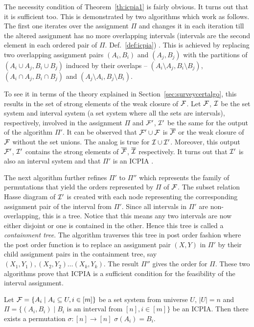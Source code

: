 The necessity condition of Theorem~\ref{th:icpia1} is fairly
obvious. It turns out that it is sufficient too.  This is demonstrated
by two algorithms which work as follows. The first one iterates over
the assignment $\Pi$ %
and changes it in each iteration till the altered
assignment %
has no more overlapping intervals (intervals are the second
  element in each ordered pair of $\Pi$. Def.~\ref{def:icpia}) %
\cite[Alg.~1]{nsnrs09}. This is achieved by replacing two overlapping
assignment pairs $(A_i, B_i)$ and $(A_j, B_j)$ with the partitions of
$(A_i \cup A_j,B_i \cup B_j)$ induced by their overlaps -- $(A_i
\setminus A_j, B_i \setminus B_j)$, $(A_i \cap A_j, B_i \cap B_j)$ and
$(A_j \setminus A_i, B_j \setminus B_i)$.

To see it in terms of the theory explained in
Section~\ref{sec:surveycertalgo}, this results in the set of strong
elements of the weak closure of
${\cal F}$. Let ${\cal F}$, ${\cal I}$ be the set system and interval
system (a set system where all the sets are intervals),
respectively, involved in the assignment $\Pi$ and ${\cal F}'$, ${\cal I}'$ be
the same for the output of the algorithm $\Pi'$.  It can be observed
that ${\cal F}' \cup {\cal F}$ is $\overline{{\cal F}}$ or the weak closure of
${\cal F}$ without the set unions. The analog is true for ${\cal I} \cup {\cal I}'$.  Moreover, this output
${\cal F}'$, ${\cal I}'$ contains the strong elements of $\overline{{\cal F}}$,
$\overline{{\cal I}}$ respectively. It turns out that ${\cal I}'$ is also an
interval system and that $\Pi'$ is an ICPIA \cite[Lem.~2]{nsnrs09}.

The next algorithm \cite[Alg.~2]{nsnrs09} further refines $\Pi'$ to
$\Pi''$ which represents the family of permutations that yield the
\COP orders represented by $\Pi$ of ${\cal F}$. The subset relation Hasse
diagram of ${\cal I}'$ is created with each node representing the
corresponding assignment pair of the interval from $\Pi'$. Since all intervals in
$\Pi'$ are non-overlapping, this is a tree. Notice that this means any
two intervals are now either disjoint or one is contained in the
other. Hence this tree is called a {\em containment tree}.  The
algorithm traverses this tree in post order fashion where the post
order function is to replace an assignment pair $(X,Y)$  in $\Pi'$ by their child
assignment pairs in the containment tree, say $(X_1, Y_1),(X_2, Y_2)
\ldots (X_k,Y_k)$. The result $\Pi''$ gives the
\COP order for $\Pi$. These two algorithms prove that ICPIA is a
sufficient condition for the feasibility of the interval assignment.

\begin{theoremsansproof}
  \label{th:icpia2}
  Let  ${\cal F} = \{A_i \mid A_i \subseteq U, i \in [m]\}$ be a set system
  from universe $U$, $|U| = n$
  and $\Pi = \{(A_i,B_i) \mid B_i \text{ is an interval from } [n], i
  \in [m]\}$ be an ICPIA. Then there exists a permutation $\sigma: [n]
  \rightarrow [n]$ \stt $\sigma(A_i) = B_i$.
\end{theoremsansproof}

